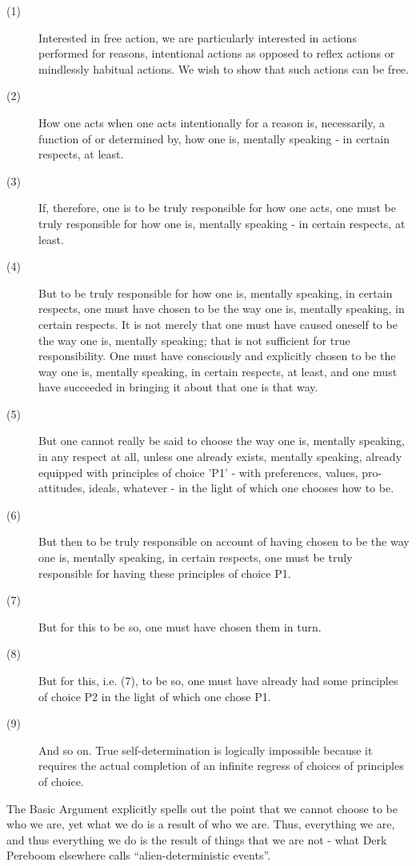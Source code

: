 \documentclass[phd,12pt,oneside,paper=letterpaper]{ubcthesis}
\begin{document}
\begin{description}
\item[(1)] Interested in free action, we are particularly interested in actions performed for reasons, intentional actions as opposed to reflex actions or mindlessly habitual actions. We wish to show that such actions can be free.
\item[(2)] How one acts when one acts intentionally for a reason is, necessarily, a function of or determined by, how one is, mentally speaking - in certain respects, at least.
\item[(3)] If, therefore, one is to be truly responsible for how one acts, one must be truly responsible for how one is, mentally speaking - in certain respects, at least.
\item[(4)] But to be truly responsible for how one is, mentally speaking, in certain respects, one must have chosen to be the way one is, mentally speaking, in certain respects. It is not merely that one must have caused oneself to be the way one is, mentally speaking; that is not sufficient for true responsibility. One must have consciously and explicitly chosen to be the way one is, mentally speaking, in certain respects, at least, and one must have succeeded in bringing it about that one is that way. 
\item[(5)] But one cannot really be said to choose the way one is, mentally speaking, in any respect at all, unless one already exists, mentally speaking, already equipped with principles of choice 'P1' - with preferences, values, pro-attitudes, ideals, whatever - in the light of which one chooses how to be.
\item[(6)] But then to be truly responsible on account of having chosen to be the way one is, mentally speaking, in certain respects, one must be truly responsible for having these principles of choice P1. 
\item[(7)] But for this to be so, one must have chosen them in turn.
\item[(8)] But for this, i.e. (7), to be so, one must have already had some principles of choice P2 in the light of which one chose P1.
\item[(9)] And so on. True self-determination is logically impossible because it requires the actual completion of an infinite regress of choices of principles of choice. 
\end{description}

The Basic Argument explicitly spells out the point that we cannot choose to be who we are, yet what we do is a result of who we are. Thus, everything we are, and thus everything we do is the result of things that we are not - what Derk Pereboom elsewhere calls ``alien-deterministic events''. \citep[p.48-50]{pereboom2001} 
\end{document}

